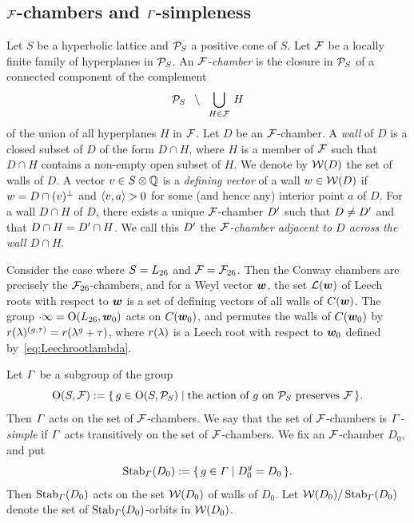 \documentclass{amsart} %
\begin{document}
\subsection{$\mathord{\mathcal{F}}$-chambers and $\varGamma$-simpleness}\label{subsec:FFF}
%
%
Let $S$ be a hyperbolic lattice
and $\mathord{\mathcal{P}}_S$ a positive cone of $S$.
Let $\mathord{\mathcal{F}}$ be a locally finite family of hyperplanes in $\mathord{\mathcal{P}}_S$.
An \emph{$\mathord{\mathcal{F}}$-chamber} is the closure in $\mathord{\mathcal{P}}_S$ of a connected component 
of the complement
\[
\mathord{\mathcal{P}}_S\;\;\setminus \;\; \bigcup_{H\in \mathord{\mathcal{F}}}\, H
\]
of the union of all hyperplanes $H$ in $\mathord{\mathcal{F}}$.
Let $D$ be an $\mathord{\mathcal{F}}$-chamber.
A \emph{wall} of $D$ is a closed subset of $D$
of the form $D\cap H$, where $H$ is a member of $\mathord{\mathcal{F}}$
such that $D\cap H$ contains a non-empty open subset of $H$.
We denote by $\mathord{\mathcal{W}}(D)$ the set of walls of $D$.
A vector $v\in S\otimes\mathord{\mathbb{Q}}$ is a \emph{defining vector} of a wall $w\in \mathord{\mathcal{W}}(D)$ 
if $w=D\cap (v)^{\perp}$ and $\langle v, a \rangle>0$ for some (and hence any) interior point $a$ of $D$.
For a wall $D\cap H$ of $D$,
there exists a unique $\mathord{\mathcal{F}}$-chamber $D^{\prime}$
such that $D\ne D^{\prime}$ and that $D\cap H=D^{\prime}\cap H$.
We call this $D^{\prime}$ the \emph{$\mathord{\mathcal{F}}$-chamber adjacent to $D$ across the wall $D\cap H$}.
%
\begin{example}
Consider the case where $S=L_{26}$ and $\mathord{\mathcal{F}}={\mathord{\mathcal{F}}}_{26}$.
Then the Conway chambers are precisely the ${\mathord{\mathcal{F}}}_{26}$-chambers,
and for a Weyl vector $\boldsymbol{w}$,
the set $\mathord{\mathcal{L}}(\boldsymbol{w})$ of Leech roots  with respect to $\boldsymbol{w}$ is  
a set of 
defining vectors of all walls of $\mathord{C}(\boldsymbol{w})$.
The group $\cdot \infty=\mathord{\mathrm{O}}(L_{26}, \boldsymbol{w}_0)$ 
acts on $\mathord{C}(\boldsymbol{w}_0)$, and permutes 
the walls of $\mathord{C}(\boldsymbol{w}_0)$ by %
$r(\lambda)^{(g, \tau)}=r(\lambda^g+\tau)$,
where $r(\lambda)$ is a Leech root  with respect to $\boldsymbol{w}_0$
defined by~\eqref{eq:Leechrootlambda}.
\end{example}
%
Let $\varGamma$ be a subgroup
of the group 
\[
\mathord{\mathrm{O}}(S, \mathord{\mathcal{F}}):=\{\,{g\in \mathord{\mathrm{O}}(S, \mathord{\mathcal{P}}_S)}\mid {\textrm{the action of $g$ on $\mathord{\mathcal{P}}_S$ preserves $\mathord{\mathcal{F}}$}} \,\}.
\]
%
%
Then $\varGamma$ acts on the set of $\mathord{\mathcal{F}}$-chambers.
We say that the set of $\mathord{\mathcal{F}}$-chambers is \emph{$\varGamma$-simple}
if $\varGamma$ acts transitively on the set of $\mathord{\mathcal{F}}$-chambers.
We fix an $\mathord{\mathcal{F}}$-chamber $D_0$, and put
\[
\operatorname{Stab}_{\varGamma}(D_0):=\{\,{g\in \varGamma}\mid {D_0^g=D_0} \,\}.
\]
Then $\operatorname{Stab}_{\varGamma}(D_0)$ acts on the set $\mathord{\mathcal{W}}(D_0)$ of walls of $D_0$.
Let $\mathord{\mathcal{W}}(D_0)/\operatorname{Stab}_{\varGamma}(D_0)$ denote the set of 
$\operatorname{Stab}_{\varGamma}(D_0)$-orbits in $\mathord{\mathcal{W}}(D_0)$.
\par
\end{document}
